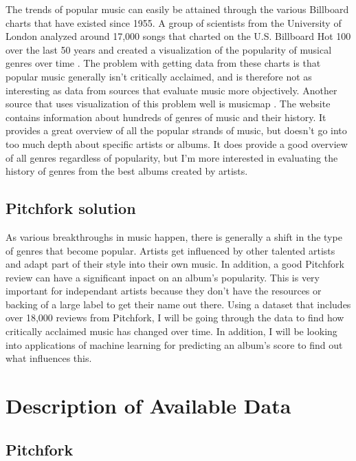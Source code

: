 \documentclass{article}
\begin{document}
The trends of popular music can easily be attained through the various
Billboard charts that have existed since 1955. A group of scientists
from the University of London analyzed around 17,000 songs that charted
on the U.S. Billboard Hot 100 over the last 50 years and created a
visualization of the popularity of musical genres over time
\citep{Billboard100}. The problem with getting data from these charts is
that popular music generally isn't critically acclaimed, and is
therefore not as interesting as data from sources that evaluate music
more objectively. Another source that uses visualization of this problem
well is musicmap \citep{musicmap}. The website contains information
about hundreds of genres of music and their history. It provides a great
overview of all the popular strands of music, but doesn't go into too
much depth about specific artists or albums. It does provide a good
overview of all genres regardless of popularity, but I'm more interested
in evaluating the history of genres from the best albums created by
artists.

\subsection{Pitchfork solution}\label{pitchfork-solution}

As various breakthroughs in music happen, there is generally a shift in
the type of genres that become popular. Artists get influenced by other
talented artists and adapt part of their style into their own music. In
addition, a good Pitchfork review can have a significant inpact on an
album's popularity. This is very important for independant artists
because they don't have the resources or backing of a large label to get
their name out there. Using a dataset that includes over 18,000 reviews
from Pitchfork, I will be going through the data to find how critically
acclaimed music has changed over time. In addition, I will be looking
into applications of machine learning for predicting an album's score to
find out what influences this.

\section{Description of Available
Data}\label{description-of-available-data}

\subsection{Pitchfork}\label{pitchfork}
\end{document}

